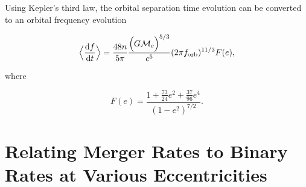 \documentclass[twocolumn]{aastex631}
\begin{document}
Using Kepler's third law, the orbital separation time evolution can be converted to an orbital frequency evolution 

\begin{equation}
    \Big\langle\frac{\mathrm{d}f}{\mathrm{d}t}\Big\rangle = \frac{48 n}{5 \pi} \frac{\Big(G \mathcal{M}_c \Big)^{5/3}}{c^5} (2 \pi f_{\rm orb})^{11/3} F(e), 
    \label{eq:fdot}
\end{equation}

\noindent where 

\begin{equation}
    F(e) = \frac{1 + \frac{73}{24} e^2 + \frac{37}{96} e^4}{(1 - e^2)^{7/2}}.
    \label{eq:eccentricity_enhancement_factor}
\end{equation}


\section{Relating Merger Rates to Binary Rates at Various Eccentricities}
\end{document}
